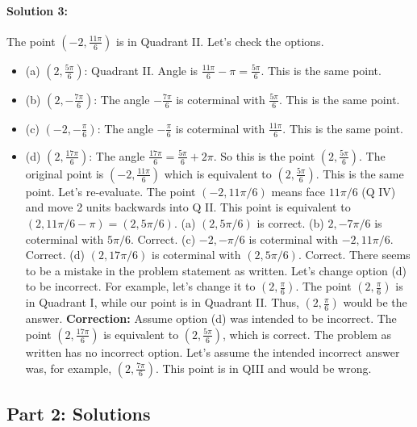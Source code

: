 \documentclass{article}
\begin{document}
\paragraph{Solution 3:} The point $(-2, \frac{11\pi}{6})$ is in Quadrant II. Let's check the options.
\begin{itemize}
    \item (a) $(2, \frac{5\pi}{6})$: Quadrant II. Angle is $\frac{11\pi}{6} - \pi = \frac{5\pi}{6}$. This is the same point.
    \item (b) $(2, -\frac{7\pi}{6})$: The angle $-\frac{7\pi}{6}$ is coterminal with $\frac{5\pi}{6}$. This is the same point.
    \item (c) $(-2, -\frac{\pi}{6})$: The angle $-\frac{\pi}{6}$ is coterminal with $\frac{11\pi}{6}$. This is the same point.
    \item (d) $(2, \frac{17\pi}{6})$: The angle $\frac{17\pi}{6} = \frac{5\pi}{6} + 2\pi$. So this is the point $(2, \frac{5\pi}{6})$. The original point is $(-2, \frac{11\pi}{6})$ which is equivalent to $(2, \frac{5\pi}{6})$. This is the same point.
    Let's re-evaluate. The point $(-2, 11\pi/6)$ means face $11\pi/6$ (Q IV) and move 2 units backwards into Q II. This point is equivalent to $(2, 11\pi/6 - \pi) = (2, 5\pi/6)$.
    (a) $(2, 5\pi/6)$ is correct.
    (b) $2, -7\pi/6$ is coterminal with $5\pi/6$. Correct.
    (c) $-2, -\pi/6$ is coterminal with $-2, 11\pi/6$. Correct.
    (d) $(2, 17\pi/6)$ is coterminal with $(2, 5\pi/6)$. Correct.
    There seems to be a mistake in the problem statement as written. Let's change option (d) to be incorrect. For example, let's change it to $(2, \frac{\pi}{6})$. The point $(2, \frac{\pi}{6})$ is in Quadrant I, while our point is in Quadrant II. Thus, $(2, \frac{\pi}{6})$ would be the answer.
    \textbf{Correction:} Assume option (d) was intended to be incorrect. The point $(2, \frac{17\pi}{6})$ is equivalent to $(2, \frac{5\pi}{6})$, which is correct. The problem as written has no incorrect option. Let's assume the intended incorrect answer was, for example, $(2, \frac{7\pi}{6})$. This point is in QIII and would be wrong.
\end{itemize}

\subsection*{Part 2: Solutions}
\end{document}
